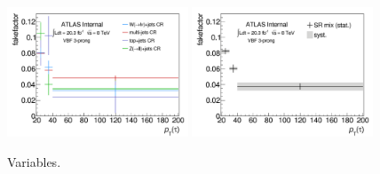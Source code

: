 \begin{figure}[tp]
  \centering
  \includegraphics[width=0.48\textwidth]{figures/backgrounds/fakefactor_8TeV_vbf_3p_CRs}
  \includegraphics[width=0.48\textwidth]{figures/backgrounds/fakefactor_8TeV_vbf_3p_mix}
  \caption{Variables.}
  \label{fig:backgrounds-fakefactorsVBF3p}
\end{figure}

